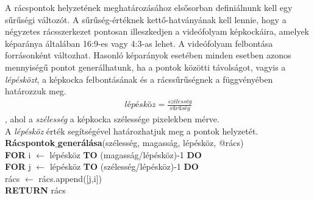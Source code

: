 A rácspontok helyzetének meghatározásához elsősorban definiálnunk kell egy sűrűségi változót. A sűrűség-értéknek kettő-hatványának kell lennie, hogy a négyzetes rácsszerkezet pontosan illeszkedjen a videófolyam képkockáira, amelyek képaránya általában 16:9-es vagy 4:3-as lehet. A videófolyam felbontása forrásonként változhat. Hasonló képarányok esetében minden esetben azonos mennyiségű pontot generálhatunk, ha a pontok közötti távolságot, vagyis a \textit{lépésközt}, a képkocka felbontásának és a rácssűrűségnek a függvényében határozzuk meg.
\begin{align*}
\textit{lépésköz} = \frac{\textit{szélesség}}{\textit{sűrűség}}
\end{align*}
, ahol a \textit{szélesség} a képkocka szélessége pixelekben mérve.\\
A \textit{lépésköz} érték segítségével határozhatjuk meg a pontok helyzetét.\\
\newline
\noindent \textbf{Rácspontok$\_$generálása}(szélesség, magasság, lépésköz, @rács)\\ 
\textbf{FOR} i $\leftarrow$ lépésköz \textbf{TO} (magasság/lépésköz)-1 \textbf{DO}\\
\indent \textbf{FOR} j $\leftarrow$ lépésköz \textbf{TO} (szélesség/lépésköz)-1 \textbf{DO}\\
\indent \indent rács $\leftarrow$ rács.append([j,i])\\
\textbf{RETURN} rács


